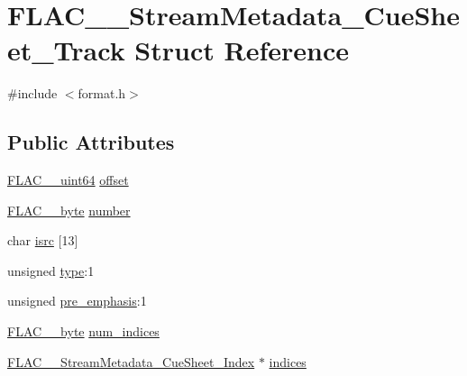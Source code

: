 \hypertarget{struct_f_l_a_c_____stream_metadata___cue_sheet___track}{}\section{F\+L\+A\+C\+\_\+\+\_\+\+Stream\+Metadata\+\_\+\+Cue\+Sheet\+\_\+\+Track Struct Reference}
\label{struct_f_l_a_c_____stream_metadata___cue_sheet___track}


{\ttfamily \#include $<$format.\+h$>$}

\subsection*{Public Attributes}
\begin{DoxyCompactItemize}
\item 
\hyperlink{ordinals_8h_aa78c8c70a3eb8a58af7436f278acde8e}{F\+L\+A\+C\+\_\+\+\_\+uint64} \hyperlink{struct_f_l_a_c_____stream_metadata___cue_sheet___track_a40e1c888253a56b6dc4885a44138d1bf}{offset}
\item 
\hyperlink{ordinals_8h_a5eb569b12d5b047cdacada4d57924ee3}{F\+L\+A\+C\+\_\+\+\_\+byte} \hyperlink{struct_f_l_a_c_____stream_metadata___cue_sheet___track_a429103d63c44d1861b4dc0762726701a}{number}
\item 
char \hyperlink{struct_f_l_a_c_____stream_metadata___cue_sheet___track_a4990c8b13969f4c62683d915ebbf5744}{isrc} \mbox{[}13\mbox{]}
\item 
unsigned \hyperlink{struct_f_l_a_c_____stream_metadata___cue_sheet___track_a848575fc7a7292867ce76a9b3705f6e7}{type}\+:1
\item 
unsigned \hyperlink{struct_f_l_a_c_____stream_metadata___cue_sheet___track_ab4a97e43166ee16d1d16cccd901ddc3a}{pre\+\_\+emphasis}\+:1
\item 
\hyperlink{ordinals_8h_a5eb569b12d5b047cdacada4d57924ee3}{F\+L\+A\+C\+\_\+\+\_\+byte} \hyperlink{struct_f_l_a_c_____stream_metadata___cue_sheet___track_a5f1c1d7e3ddc533938b83951c7b3dda5}{num\+\_\+indices}
\item 
\hyperlink{struct_f_l_a_c_____stream_metadata___cue_sheet___index}{F\+L\+A\+C\+\_\+\+\_\+\+Stream\+Metadata\+\_\+\+Cue\+Sheet\+\_\+\+Index} $\ast$ \hyperlink{struct_f_l_a_c_____stream_metadata___cue_sheet___track_a14e0692a77b5b6689e208f48369edb90}{indices}
\end{DoxyCompactItemize}



